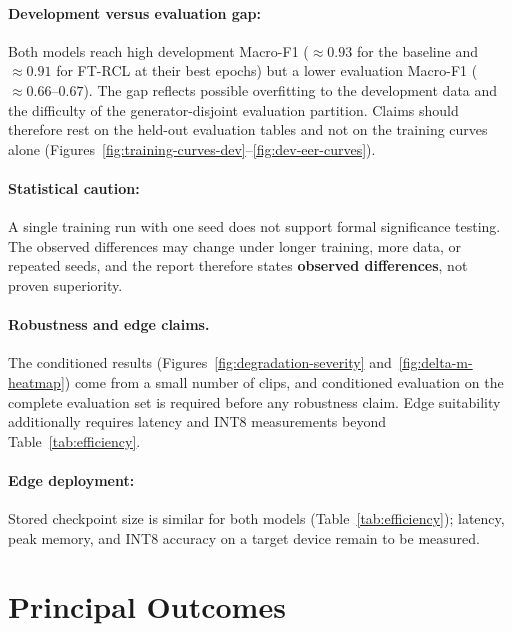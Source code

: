 \paragraph{Development versus evaluation gap:} Both models reach high development Macro-F1 (${\approx}0.93$ for the baseline and ${\approx}0.91$ for FT-RCL at their best epochs) but a lower evaluation Macro-F1 (${\approx}0.66$--$0.67$). The gap reflects possible overfitting to the development data and the difficulty of the generator-disjoint evaluation partition. Claims should therefore rest on the held-out evaluation tables and not on the training curves alone (Figures~\ref{fig:training-curves-dev}--\ref{fig:dev-eer-curves}).

\paragraph{Statistical caution:} A single training run with one seed does not support formal significance testing. The observed differences may change under longer training, more data, or repeated seeds, and the report therefore states \textbf{observed differences}, not proven superiority.

\paragraph{Robustness and edge claims.} The conditioned results (Figures~\ref{fig:degradation-severity} and~\ref{fig:delta-m-heatmap}) come from a small number of clips, and conditioned evaluation on the complete evaluation set is required before any robustness claim. Edge suitability additionally requires latency and INT8 measurements beyond Table~\ref{tab:efficiency}.

\paragraph{Edge deployment:} Stored checkpoint size is similar for both models (Table~\ref{tab:efficiency}); latency, peak memory, and INT8 accuracy on a target device remain to be measured.

\section{Principal Outcomes}

